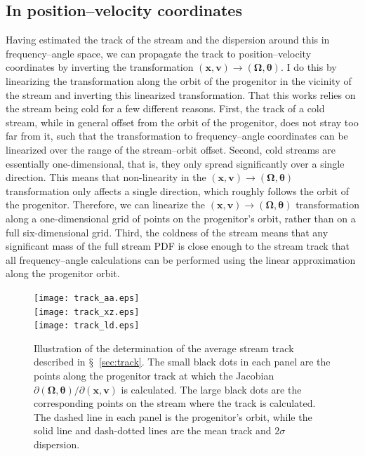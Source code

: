\documentclass[12pt,preprint]{aastex}
\newcommand{\sectionname}{$\mathsection$}
\renewcommand{\vec}[1]{\ensuremath{\mathbf{#1}}}
\newcommand{\vecx}{\ensuremath{\vec{x}}}
\newcommand{\vecv}{\ensuremath{\vec{v}}}
\newcommand{\veco}{\ensuremath{\vec{\Omega}}}
\newcommand{\veca}{\ensuremath{\boldsymbol\theta}}
\begin{document}
\subsection{In position--velocity coordinates}\label{sec:trackxv}

Having estimated the track of the stream and the dispersion around
this in frequency--angle space, we can propagate the track to
position--velocity coordinates by inverting the transformation
$(\vecx,\vecv) \rightarrow (\veco,\veca)$. I do this by linearizing
the transformation along the orbit of the progenitor in the vicinity
of the stream and inverting this linearized transformation. That this
works relies on the stream being cold for a few different
reasons. First, the track of a cold stream, while in general offset
from the orbit of the progenitor, does not stray too far from it, such
that the transformation to frequency--angle coordinates can be
linearized over the range of the stream--orbit offset. Second, cold
streams are essentially one-dimensional, that is, they only spread
significantly over a single direction. This means that non-linearity
in the $(\vecx,\vecv) \rightarrow (\veco,\veca)$ transformation only
affects a single direction, which roughly follows the orbit of the
progenitor. Therefore, we can linearize the $(\vecx,\vecv) \rightarrow
(\veco,\veca)$ transformation along a one-dimensional grid of points
on the progenitor's orbit, rather than on a full six-dimensional
grid. Third, the coldness of the stream means that any significant
mass of the full stream PDF is close enough to the stream track that
all frequency--angle calculations can be performed using the linear
approximation along the progenitor orbit.

\begin{figure}
  \texttt{[image: track\_aa.eps]}\\
  \texttt{[image: track\_xz.eps]}\\
  \texttt{[image: track\_ld.eps]}
  \caption{Illustration of the determination of the average stream
    track described in \sectionname~\ref{sec:track}. The small black
    dots in each panel are the points along the progenitor track at
    which the Jacobian $\partial (\veco,\veca) / \partial
    (\vecx,\vecv)$ is calculated. The large black dots are the
    corresponding points on the stream where the track is
    calculated. The dashed line in each panel is the progenitor's
    orbit, while the solid line and dash-dotted lines are the mean
    track and $2\sigma$ dispersion.}\label{fig:track}
\end{figure}
\end{document}
